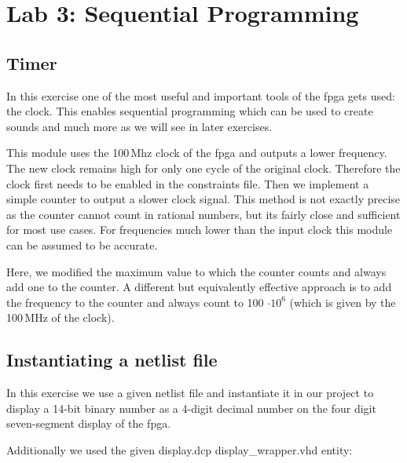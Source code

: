\chapter{Lab 3: Sequential Programming} \label{day3}

\section{Timer}

In this exercise one of the most useful and important tools of the \gls{fpga} gets used: the clock. This enables sequential programming which can be used to create sounds and much more as we will see in later exercises.

This module uses the 100\,Mhz clock of the \gls{fpga} and outputs a lower frequency. The new clock remains high for only one cycle of the original clock. Therefore the clock first needs to be enabled in the constraints file. Then we implement a simple counter to output a slower clock signal. This method is not exactly precise as the counter cannot count in rational numbers, but its fairly close and sufficient for most use cases. For frequencies much lower than the input clock this module can be assumed to be accurate.

Here, we modified the maximum value to which the counter counts and always add one to the counter. A different but equivalently effective approach is to add the frequency to the counter and always count to 100 $\cdot 10^{6}$ (which is given by the 100\,MHz of the clock).





\section{Instantiating a netlist file}

In this exercise we use a given netlist file and instantiate it in our project to display a 14-bit binary number as a 4-digit decimal number on the four digit seven-segment display of the \gls{fpga}. 



Additionally we used the given display.dcp display\_wrapper.vhd entity:



